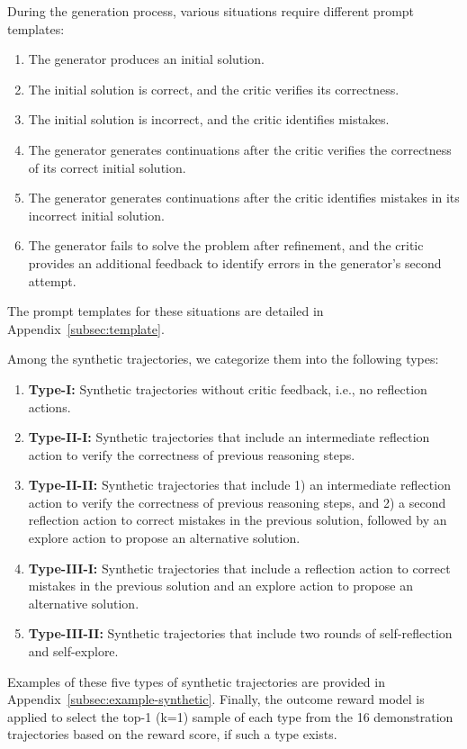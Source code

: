 During the generation process, various situations require different prompt templates:
\begin{enumerate} \item The generator produces an initial solution.
\item The initial solution is correct, and the critic verifies its correctness.
\item The initial solution is incorrect, and the critic identifies mistakes.
\item The generator generates continuations after the critic verifies the correctness of its correct initial solution.
\item The generator generates continuations after the critic identifies mistakes in its incorrect initial solution.
\item The generator fails to solve the problem after refinement, and the critic provides an additional feedback to identify errors in the generator's second attempt.
\end{enumerate}
The prompt templates for these situations are detailed in Appendix~\ref{subsec:template}.

Among the synthetic trajectories, we categorize them into the following types:
\begin{enumerate} \item \textbf{Type-I:} Synthetic trajectories without critic feedback, i.e., no reflection actions.
\item \textbf{Type-II-I:} Synthetic trajectories that include an intermediate reflection action to verify the correctness of previous reasoning steps.
\item \textbf{Type-II-II:} Synthetic trajectories that include 1) an intermediate reflection action to verify the correctness of previous reasoning steps, and 2) a second reflection action to correct mistakes in the previous solution, followed by an explore action to propose an alternative solution.
\item \textbf{Type-III-I:} Synthetic trajectories that include a reflection action to correct mistakes in the previous solution and an explore action to propose an alternative solution.
\item \textbf{Type-III-II:} Synthetic trajectories that include two rounds of self-reflection and self-explore.
\end{enumerate}
Examples of these five types of synthetic trajectories are provided in Appendix~\ref{subsec:example-synthetic}. Finally, the outcome reward model is applied to select the top-1 (k=1) sample of each type from the 16 demonstration trajectories based on the reward score, if such a type exists.

